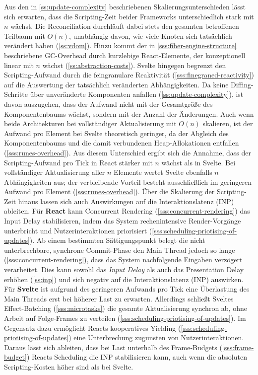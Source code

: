 Aus den in \cref{ss:update-complexity} beschriebenen Skalierungsunterschieden lässt sich erwarten, dass die Scripting-Zeit beider Frameworks unterschiedlich stark mit $n$ wächst. Die Reconciliation durchläuft dabei stets den gesamten betroffenen Teilbaum mit $O(n)$, unabhängig davon, wie viele Knoten sich tatsächlich verändert haben (\cref{ss:vdom}). Hinzu kommt der in \cref{sss:fiber-engine-structure} beschriebene GC-Overhead durch kurzlebige React-Elemente, der konzeptionell linear mit $n$ wächst (\cref{ss:abstraction-costs}). Svelte hingegen begrenzt den Scripting-Aufwand durch die feingranulare Reaktivität (\cref{sss:finegraned-reactivity}) auf die Auswertung der tatsächlich veränderten Abhängigkeiten. Da keine Diffing-Schritte über unveränderte Komponenten anfallen (\cref{ss:update-complexity}), ist davon auszugehen, dass der Aufwand nicht mit der Gesamtgröße des Komponentenbaums wächst, sondern mit der Anzahl der Änderungen. Auch wenn beide Architekturen bei vollständiger Aktualisierung mit $O(n)$ skalieren, ist der Aufwand pro Element bei Svelte theoretisch geringer, da der Abgleich des Komponentenbaums und die damit verbundenen Heap-Allokationen entfallen (\cref{sss:runes-overhead}). Aus diesem Unterschied ergibt sich die Annahme, dass der Scripting-Aufwand pro Tick in React stärker mit $n$ wächst als in Svelte. Bei vollständiger Aktualisierung aller $n$ Elemente wertet Svelte ebenfalls $n$ Abhängigkeiten aus; der verbleibende Vorteil besteht ausschließlich im geringeren Aufwand pro Element (\cref{sss:runes-overhead}). Über die Skalierung der Scripting-Zeit hinaus lassen sich auch Auswirkungen auf die Interaktionslatenz (INP) ableiten. Für \textbf{React} kann Concurrent Rendering (\cref{sss:concurrent-rendering}) das Input Delay stabilisieren, indem das System rechenintensive Render-Vorgänge unterbricht und Nutzerinteraktionen priorisiert (\cref{sss:scheduling-priotising-of-updates}). Ab einem bestimmten Sättigungspunkt belegt die nicht unterbrechbare, synchrone Commit-Phase den Main Thread jedoch so lange (\cref{sss:concurrent-rendering}), dass das System nachfolgende Eingaben verzögert verarbeitet. Dies kann sowohl das \textit{Input Delay} als auch das Presentation Delay erhöhen (\cref{ss:inp}) und sich negativ auf die Interaktionslatenz (INP) auswirken. Für \textbf{Svelte} ist aufgrund des geringeren Aufwands pro Tick eine Überlastung des Main Threads erst bei höherer Last zu erwarten. Allerdings schließt Sveltes Effect-Batching (\cref{sss:microtasks}) die gesamte Aktualisierung synchron ab, ohne Arbeit auf Folge-Frames zu verteilen (\cref{sss:scheduling-priotising-of-updates}). Im Gegensatz dazu ermöglicht Reacts kooperatives Yielding (\cref{sss:scheduling-priotising-of-updates}) eine Unterbrechung zugunsten von Nutzerinteraktionen. Daraus lässt sich ableiten, dass bei Last unterhalb des Frame-Budgets (\cref{sss:frame-budget}) Reacts Scheduling die INP stabilisieren kann, auch wenn die absoluten Scripting-Kosten höher sind als bei Svelte.

